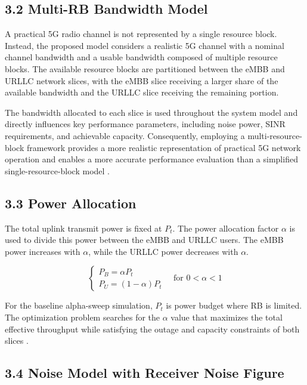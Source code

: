 \documentclass[
]{article}
\begin{document}
\subsection{3.2 Multi-RB Bandwidth
Model}\label{multi-rb-bandwidth-model}

A practical 5G radio channel is not represented by a single resource block. Instead, the proposed model considers a realistic 5G channel with a nominal channel bandwidth and a usable bandwidth composed of multiple resource blocks. The available resource blocks are partitioned between the eMBB and URLLC network slices, with the eMBB slice receiving a larger share of the available bandwidth and the URLLC slice receiving the remaining portion.

The bandwidth allocated to each slice is used throughout the system model and directly influences key performance parameters, including noise power, SINR requirements, and achievable capacity. Consequently, employing a multi-resource-block framework provides a more realistic representation of practical 5G network operation and enables a more accurate performance evaluation than a simplified single-resource-block model \parencite{Popovski2018}.

\subsection{3.3 Power Allocation}\label{power-allocation}

The total uplink transmit power is fixed at \(P_{t}\). The power
allocation factor \(α\) is used to divide this power between the eMBB and
URLLC users. The eMBB power increases with \(α\), while the URLLC power
decreases with \(α\).

\begin{equation}
\begin{cases}
  P_{B} = \alpha P_{t} \\
  P_{U} = (1 - \alpha)P_{t}
\end{cases}
\quad \text{for } 0 < \alpha < 1
\end{equation}

For the baseline alpha-sweep simulation,
\(P_{t}\) is power budget where RB is limited. The optimization problem searches
for the \(α\) value that maximizes the total effective throughput while
satisfying the outage and capacity constraints of both slices \parencite{Zhang2017}.

\subsection{3.4 Noise Model with Receiver Noise
Figure}\label{noise-model-with-receiver-noise-figure}
\end{document}
